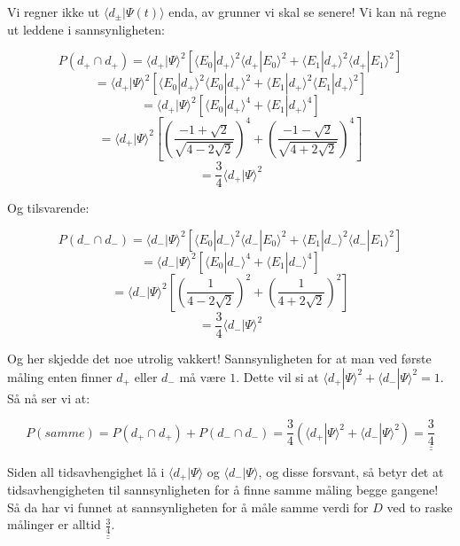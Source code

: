 \documentclass[a4paper,norsk, 10pt]{article}
\numberwithin{equation}{section}
\begin{document}
Vi regner ikke ut $\langle d_{\pm}|\Psi(t)\rangle$ enda, av grunner vi skal se senere! Vi kan nå regne ut leddene i sannsynligheten:

$$
P(d_+ \cap d_+) = \langle d_+|\Psi\rangle^2\left[\langle E_0|d_+\rangle^2\langle d_+|E_0\rangle^2 + \langle E_1|d_+\rangle^2\langle d_+|E_1\rangle^2\right]
$$
$$
= \langle d_+|\Psi\rangle^2\left[\langle E_0|d_+\rangle^2\langle E_0|d_+\rangle^2 + \langle E_1|d_+\rangle^2\langle E_1|d_+\rangle^2\right]
$$
$$
= \langle d_+|\Psi\rangle^2\left[\langle E_0|d_+\rangle^4 + \langle E_1|d_+\rangle^4\right]
$$
$$
= \langle d_+|\Psi\rangle^2\left[\left(\frac{-1+\sqrt{2}}{\sqrt{4-2\sqrt{2}}}\right)^4 + \left(\frac{-1-\sqrt{2}}{\sqrt{4+2\sqrt{2}}}\right)^4\right]
$$
$$
= \frac{3}{4}\langle d_+|\Psi\rangle^2
$$

Og tilsvarende:

$$
P(d_- \cap d_-) = \langle d_-|\Psi\rangle^2\left[\langle E_0|d_-\rangle^2\langle d_-|E_0\rangle^2 + \langle E_1|d_-\rangle^2\langle d_-|E_1\rangle^2\right]
$$
$$
= \langle d_-|\Psi\rangle^2\left[\langle E_0|d_-\rangle^4 + \langle E_1|d_-\rangle^4\right]
$$
$$
= \langle d_-|\Psi\rangle^2\left[ \left(\frac{1}{4-2\sqrt{2}}\right)^2 + \left(\frac{1}{4+2\sqrt{2}}\right)^2\right]
$$
$$
= \frac{3}{4}\langle d_-|\Psi\rangle^2
$$

Og her skjedde det noe utrolig vakkert! Sannsynligheten for at man ved første måling enten finner $d_+$ eller $d_-$ må være $1$. Dette vil si at $\langle d_+|\Psi\rangle^2 + \langle d_-|\Psi\rangle^2 = 1$. Så nå ser vi at:

\begin{equation}
P(samme) = P(d_+ \cap d_+) + P(d_- \cap d_-) = \frac{3}{4}\left(\langle d_+|\Psi\rangle^2 + \langle d_-|\Psi\rangle^2\right) = \underline{\underline{\frac{3}{4}}}
\end{equation}

Siden all tidsavhengighet lå i $\langle d_+|\Psi\rangle$ og $\langle d_-|\Psi\rangle$, og disse forsvant, så betyr det at tidsavhengigheten til sannsynligheten for å finne samme måling begge gangene!\\

Så da har vi funnet at sannsynligheten for å måle samme verdi for $D$ ved to raske målinger er alltid $\underline{\underline{\frac{3}{4}}}$.
\end{document}
